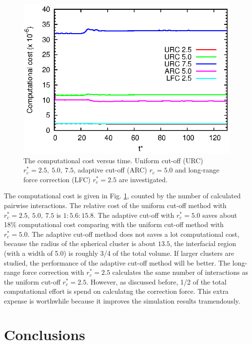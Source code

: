 \documentclass[aps,pre,preprint]{revtex4}
\begin{document}
\begin{figure}
  \centering
  \includegraphics[]{fig/cost.eps}
  \caption{The computational cost versus time. Uniform
    cut-off (URC) $r_c^\ast = 2.5,\ 5.0,\ 7.5$, adaptive cut-off (ARC)
    $r_c = 5.0$ and long-range force correction (LFC) $r^\ast_c = 2.5$
    are investigated.}
  \label{fig:tmp13}
\end{figure}

The computational cost is given in Fig. \ref{fig:tmp13}, counted by
the number of calculated pairwise interactions. The relative cost of
the uniform cut-off method with $r_c^\ast = 2.5,\ 5.0,\ 7.5$ is
$1:5.6:15.8$. The adaptive cut-off with $r_c^\ast = 5.0$ saves
about 18\% computational cost comparing with the uniform cut-off
method with $r_c^\ast = 5.0$. The adaptive cut-off method does not
saves a lot computational cost, because the radius of the spherical
cluster is about $13.5$, the interfacial region (with a width of 5.0)
is roughly 3/4 of the total volume. If larger clusters are studied,
the performance of the adaptive cut-off method will be better. The
long-range force correction with $r_c^\ast = 2.5$ calculates the same
number of interactions as the uniform cut-off $r_c^\ast =
2.5$. However, as discussed before, 1/2 of the total computational
effort is spend on calculatng the correction force. This extra expense
is worthwhile because it improves the simulation results tramendously.


\section{Conclusions}\label{sec:conclusion}



{}

\end{document}
